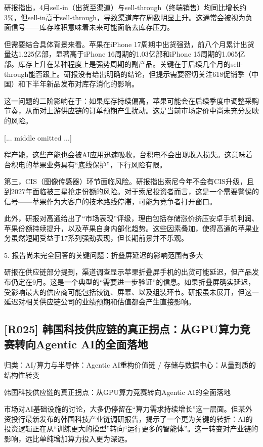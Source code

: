 \documentclass[11pt]{ctexart}
\begin{document}
研报指出，4月sell-in（出货至渠道）与sell-through（终端销售）均同比增长约3\%，但sell-in高于sell-through，导致渠道库存周数明显上升。这通常会被视为负面信号——库存堆积意味着未来可能面临去库存压力。

但需要结合具体背景来看。苹果在iPhone 17周期中出货强劲，前八个月累计出货量达1.225亿部，显著高于iPhone 16周期的1.03亿部和iPhone 15周期的1.065亿部。库存上升在某种程度上是强势周期的副产品。关键在于后续几个月的sell-through能否跟上。研报没有给出明确的结论，但提示需要密切关注618促销季（中国）和下半年新品发布对库存消化的影响。

这一问题的二阶影响在于：如果库存持续偏高，苹果可能会在后续季度中调整采购节奏，从而对上游供应链的订单预期产生扰动。这是当前市场定价中尚未充分反映的风险。


[... middle omitted ...]

程产能，这些产能也会被AI应用迅速吸收，台积电不会出现收入损失。这意味着台积电的苹果业务具有“底线保护”，下行风险有限。

第三，CIS（图像传感器）环节面临风险。研报指出索尼今年不会有CIS升级，且到2027年面临被三星抢走份额的风险。对于索尼投资者而言，这是一个需要警惕的信号——苹果作为大客户的技术路线停滞，可能为竞争者打开窗口。

此外，研报对高通给出了“市场表现”评级，理由包括存储涨价挤压安卓手机利润、苹果份额持续提升，以及苹果自身内部化趋势。这些因素叠加，使得高通的苹果业务虽然短期受益于17系列强劲表现，但长期前景并不乐观。

5. 报告尚未完全回答的关键问题：折叠屏延迟的影响范围有多大

研报在供应链部分提到，渠道调查显示苹果折叠屏手机的出货可能延迟，但产品发布仍定在9月。这是一个典型的“需要进一步验证”的信息。如果折叠屏确实延迟，受影响最大的供应商可能包括铰链、屏幕、以及组装环节。研报虽未展开，但这一延迟对相关供应链公司的业绩预期和估值都会产生直接影响。

\subsection{[R025] 韩国科技供应链的真正拐点：从GPU算力竞赛转向Agentic AI的全面落地}
{\small\color{refgray}归类：AI/算力与半导体：Agentic AI重构价值链 / 存储与数据中心：从量到质的结构性转变}

韩国科技供应链的真正拐点：从GPU算力竞赛转向Agentic AI的全面落地

市场对AI基础设施的讨论，大多仍停留在“算力需求持续增长”这一层面。但某外资投行最新发布的韩国科技产业链调研报告，揭示了一个更为关键的转折：AI的投资逻辑正在从“训练更大的模型”转向“运行更多的智能体”。这一转变对产业链的影响，远比单纯增加算力投入更为深远。
\end{document}
